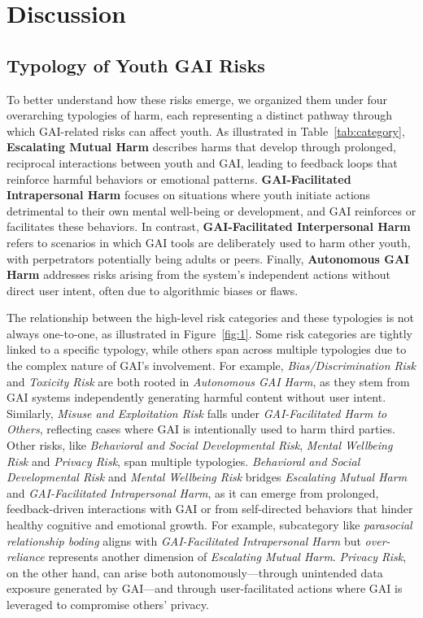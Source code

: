 \vspace{-8pt}
\section{Discussion}
\vspace{-4pt}
\subsection{Typology of Youth GAI Risks} 
\vspace{-3pt}
To better understand how these risks emerge, we organized them under four overarching typologies of harm, each representing a distinct pathway through which GAI-related risks can affect youth. As illustrated in Table~\ref{tab:category}, \textbf{Escalating Mutual Harm} describes harms that develop through prolonged, reciprocal interactions between youth and GAI, leading to feedback loops that reinforce harmful behaviors or emotional patterns. \textbf{GAI-Facilitated Intrapersonal Harm} focuses on situations where youth initiate actions detrimental to their own mental well-being or development, and GAI reinforces or facilitates these behaviors. In contrast, \textbf{GAI-Facilitated Interpersonal Harm} refers to scenarios in which GAI tools are deliberately used to harm other youth, with perpetrators potentially being adults or peers. Finally, \textbf{Autonomous GAI Harm} addresses risks arising from the system’s independent actions without direct user intent, often due to algorithmic biases or flaws.

The relationship between the high-level risk categories and these typologies is not always one-to-one, as illustrated in Figure~\ref{fig:1}. Some risk categories are tightly linked to a specific typology, while others span across multiple typologies due to the complex nature of GAI’s involvement. For example, \textit{Bias/Discrimination Risk} and \textit{Toxicity Risk} are both rooted in \textit{Autonomous GAI Harm}, as they stem from GAI systems independently generating harmful content without user intent. Similarly, \textit{Misuse and Exploitation Risk} falls under \textit{GAI-Facilitated Harm to Others}, reflecting cases where GAI is intentionally used to harm third parties. Other risks, like \textit{Behavioral and Social Developmental Risk}, \textit{Mental Wellbeing Risk} and \textit{Privacy Risk}, span multiple typologies. \textit{Behavioral and Social Developmental Risk} and \textit{Mental Wellbeing Risk} bridges \textit{Escalating Mutual Harm} and \textit{GAI-Facilitated Intrapersonal Harm}, as it can emerge from prolonged, feedback-driven interactions with GAI or from self-directed behaviors that hinder healthy cognitive and emotional growth. For example, subcategory like \textit{parasocial relationship boding} aligns with \textit{GAI-Facilitated Intrapersonal Harm} but \textit{over-reliance} represents another dimension of \textit{Escalating Mutual Harm}. \textit{Privacy Risk}, on the other hand, can arise both autonomously—through unintended data exposure generated by GAI—and through user-facilitated actions where GAI is leveraged to compromise others' privacy. 

